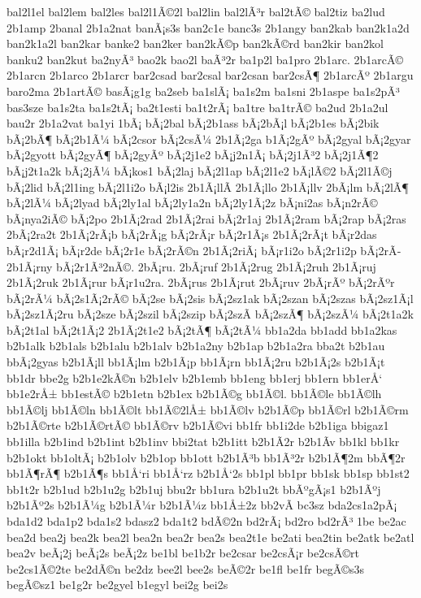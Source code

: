 {bal2l1el
bal2lem
bal2les
bal2l1Ã©2l
bal2lin
bal2lÃ³r
bal2tÃ©
bal2tiz
ba2lud
2b1amp
2banal
2b1a2nat
banÃ¡s3s
ban2c1e
banc3s
2b1angy
ban2kab
ban2k1a2d
ban2k1a2l
ban2kar
banke2
ban2ker
ban2kÃ©p
ban2kÃ©rd
ban2kir
ban2kol
banku2
ban2kut
ba2nyÃ³
bao2k
bao2l
baÃ³2r
ba1p2l
ba1pro
2b1arc.
2b1arcÃ©
2b1arcn
2b1arco
2b1arcr
bar2csad
bar2csal
bar2csan
bar2csÃ¶
2b1arcÃº
2b1argu
baro2ma
2b1artÃ©
basÃ¡g1g
ba2seb
ba1slÃ¡
ba1s2m
ba1sni
2b1aspe
ba1s2pÃ³
bas3sze
ba1s2ta
ba1s2tÃ¡
ba2t1esti
ba1t2rÃ¡
ba1tre
ba1trÃ©
ba2ud
2b1a2ul
bau2r
2b1a2vat
ba1yi
1bÃ¡
bÃ¡2bal
bÃ¡2b1ass
bÃ¡2bÃ¡l
bÃ¡2b1es
bÃ¡2bik
bÃ¡2bÃ¶
bÃ¡2b1Ã¼
bÃ¡2csor
bÃ¡2csÃ¼
2b1Ã¡2ga
b1Ã¡2gÃº
bÃ¡2gyal
bÃ¡2gyar
bÃ¡2gyott
bÃ¡2gyÃ¶
bÃ¡2gyÃº
bÃ¡2j1e2
bÃ¡j2n1Ã¡
bÃ¡2j1Ã³2
bÃ¡2j1Ã¶2
bÃ¡j2t1a2k
bÃ¡2jÃ¼
bÃ¡kos1
bÃ¡2laj
bÃ¡2l1ap
bÃ¡2l1e2
bÃ¡lÃ©2
bÃ¡2l1Ã©j
bÃ¡2lid
bÃ¡2l1ing
bÃ¡2l1i2o
bÃ¡l2is
2b1Ã¡llÃ­
2b1Ã¡llo
2b1Ã¡llv
2bÃ¡lm
bÃ¡2lÃ¶
bÃ¡2lÃ¼
bÃ¡2lyad
bÃ¡2ly1al
bÃ¡2ly1a2n
bÃ¡2ly1Ã¡2z
bÃ¡ni2as
bÃ¡n2rÃ©
bÃ¡nya2iÃ©
bÃ¡2po
2b1Ã¡2rad
2b1Ã¡2rai
bÃ¡2r1aj
2b1Ã¡2ram
bÃ¡2rap
bÃ¡2ras
2bÃ¡2ra2t
2b1Ã¡2rÃ¡b
bÃ¡2rÃ¡g
bÃ¡2rÃ¡r
bÃ¡2r1Ã¡s
2b1Ã¡2rÃ¡t
bÃ¡r2das
bÃ¡r2d1Ã¡
bÃ¡r2de
bÃ¡2r1e
bÃ¡2rÃ©n
2b1Ã¡2riÃ¡
bÃ¡r1i2o
bÃ¡2r1i2p
bÃ¡2rÃ­
2b1Ã¡rny
bÃ¡2r1Ã³2nÃ©.
2bÃ¡ru.
2bÃ¡ruf
2b1Ã¡2rug
2b1Ã¡2ruh
2b1Ã¡ruj
2b1Ã¡2ruk
2b1Ã¡rur
bÃ¡r1u2ra.
2bÃ¡rus
2b1Ã¡rut
2bÃ¡ruv
2bÃ¡rÃº
bÃ¡2rÃºr
bÃ¡2rÃ¼
bÃ¡2s1Ã¡2rÃ©
bÃ¡2se
bÃ¡2sis
bÃ¡2sz1ak
bÃ¡2szan
bÃ¡2szas
bÃ¡2sz1Ã¡l
bÃ¡2sz1Ã¡2ru
bÃ¡2sze
bÃ¡2szil
bÃ¡2szip
bÃ¡2szÃ­
bÃ¡2szÃ¶
bÃ¡2szÃ¼
bÃ¡2t1a2k
bÃ¡2t1al
bÃ¡2t1Ã¡2
2b1Ã¡2t1e2
bÃ¡2tÃ¶
bÃ¡2tÃ¼
bb1a2da
bb1add
bb1a2kas
b2b1alk
b2b1als
b2b1alu
b2b1alv
b2b1a2ny
b2b1ap
b2b1a2ra
bba2t
b2b1au
bbÃ¡2gyas
b2b1Ã¡ll
bb1Ã¡lm
b2b1Ã¡p
bb1Ã¡rn
bb1Ã¡2ru
b2b1Ã¡2s
b2b1Ã¡t
bb1dr
bbe2g
b2b1e2kÃ©n
b2b1elv
b2b1emb
bb1eng
bb1erj
bb1ern
bb1erÅ‘
bb1e2rÅ±
bb1estÃ©
b2b1etn
b2b1ex
b2b1Ã©g
bb1Ã©l.
bb1Ã©le
bb1Ã©lh
bb1Ã©lj
bb1Ã©ln
bb1Ã©lt
bb1Ã©2lÅ±
bb1Ã©lv
b2b1Ã©p
bb1Ã©rl
b2b1Ã©rm
b2b1Ã©rte
b2b1Ã©rtÃ©
bb1Ã©rv
b2b1Ã©vi
bb1fr
bb1i2de
b2b1iga
bbigaz1
bb1illa
b2b1ind
b2b1int
b2b1inv
bbi2tat
b2b1itt
b2b1Ã­2r
b2b1Ã­v
bb1kl
bb1kr
b2b1okt
bb1oltÃ¡
b2b1olv
b2b1op
bb1ott
b2b1Ã³b
bb1Ã³2r
b2b1Ã¶2m
bbÃ¶2r
bb1Ã¶rÃ¶
b2b1Ã¶s
bb1Å‘ri
bb1Å‘rz
b2b1Å‘2s
bb1pl
bb1pr
bb1sk
bb1sp
bb1st2
bb1t2r
b2b1ud
b2b1u2g
b2b1uj
bbu2r
bb1ura
b2b1u2t
bbÃºgÃ¡s1
b2b1Ãºj
b2b1Ãº2s
b2b1Ã¼g
b2b1Ã¼r
b2b1Ã¼z
bb1Å±2z
bb2vÃ­
bc3sz
bda2cs1a2pÃ¡
bda1d2
bda1p2
bda1s2
bdasz2
bda1t2
bdÃ©2n
bd2rÃ¡
bd2ro
bd2rÃ³
1be
be2ac
bea2d
bea2j
bea2k
bea2l
bea2n
bea2r
bea2s
bea2t1e
be2ati
bea2tin
be2atk
be2atl
bea2v
beÃ¡2j
beÃ¡2s
beÃ¡2z
be1bl
be1b2r
be2csar
be2csÃ¡r
be2csÃ©rt
be2cs1Ã©2te
be2dÃ©n
be2dz
bee2l
bee2s
beÃ©2r
be1fl
be1fr
begÃ©s3s
begÃ©sz1
be1g2r
be2gyel
b1egyl
bei2g
bei2s
}
